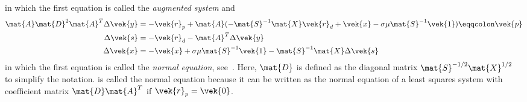 in which the first equation is called the \emph{augmented system} and 
\begin{subequations}\label{eqn:normal-equation-system}
  \begin{align}
    \mat{A} \mat{D}^2 \mat{A}^T \Delta\vek{y} &= -\vek{r}_p + \mat{A} ( -\mat{S}^{-1} \mat{X} \vek{r}_d + \vek{x} - \sigma \mu \mat{S}^{-1} \vek{1} ) \eqqcolon \vek{p} \label{eqn:normal-equation} \\
    \Delta\vek{s} &= -\vek{r}_d - \mat{A}^T \Delta\vek{y} \label{eqn:s-from-normal} \\
    \Delta\vek{x} &= -\vek{x} + \sigma \mu \mat{S}^{-1} \vek{1} - \mat{S}^{-1} \mat{X} \Delta\vek{s} \label{eqn:x-from-normal}
  \end{align}
\end{subequations}
in which the first equation is called the \emph{normal equation}, see~\cite[p. 16]{Wright-PrimalDualInteriorPointMethods}.
Here, \(\mat{D}\) is defined as the diagonal matrix \(\mat{S}^{-1/2} \mat{X}^{1/2}\) to simplify the notation.
 is called the normal equation because it can be written as the normal equation of a least squares system with coefficient matrix \(\mat{D}\mat{A}^T\) if \(\vek{r}_p = \vek{0}\).

